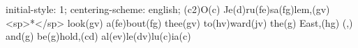 initial-style: 1;
centering-scheme: english;
(c2)O(c) Je(d)ru(fe)sa(fg)lem,(gv) <sp>*</sp> look(gv) a(fe)bout(fg) thee(gv) to(hv)ward(jv) the(g) East,(hg) (,) and(g) be(g)hold,(cd) al(ev)le(dv)lu(c)ia(c)